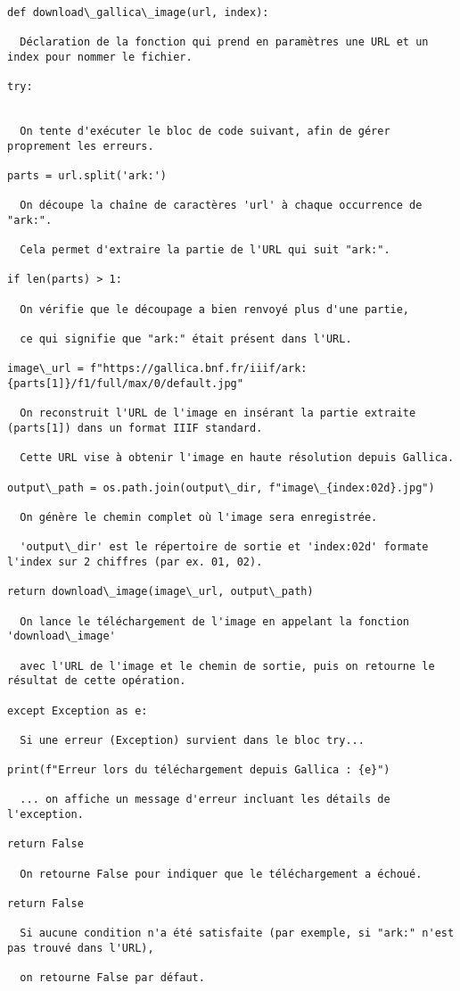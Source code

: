 \begin{verbatim}

def download\_gallica\_image(url, index):

  Déclaration de la fonction qui prend en paramètres une URL et un index pour nommer le fichier.

try:


  On tente d'exécuter le bloc de code suivant, afin de gérer proprement les erreurs.

parts = url.split('ark:')

  On découpe la chaîne de caractères 'url' à chaque occurrence de "ark:".

  Cela permet d'extraire la partie de l'URL qui suit "ark:".

if len(parts) > 1:

  On vérifie que le découpage a bien renvoyé plus d'une partie,

  ce qui signifie que "ark:" était présent dans l'URL.

image\_url = f"https://gallica.bnf.fr/iiif/ark:{parts[1]}/f1/full/max/0/default.jpg"

  On reconstruit l'URL de l'image en insérant la partie extraite (parts[1]) dans un format IIIF standard.

  Cette URL vise à obtenir l'image en haute résolution depuis Gallica.

output\_path = os.path.join(output\_dir, f"image\_{index:02d}.jpg")

  On génère le chemin complet où l'image sera enregistrée.

  'output\_dir' est le répertoire de sortie et 'index:02d' formate l'index sur 2 chiffres (par ex. 01, 02).

return download\_image(image\_url, output\_path)

  On lance le téléchargement de l'image en appelant la fonction 'download\_image'

  avec l'URL de l'image et le chemin de sortie, puis on retourne le résultat de cette opération.

except Exception as e:

  Si une erreur (Exception) survient dans le bloc try...

print(f"Erreur lors du téléchargement depuis Gallica : {e}")

  ... on affiche un message d'erreur incluant les détails de l'exception.

return False

  On retourne False pour indiquer que le téléchargement a échoué.

return False

  Si aucune condition n'a été satisfaite (par exemple, si "ark:" n'est pas trouvé dans l'URL),

  on retourne False par défaut.

\end{verbatim}

